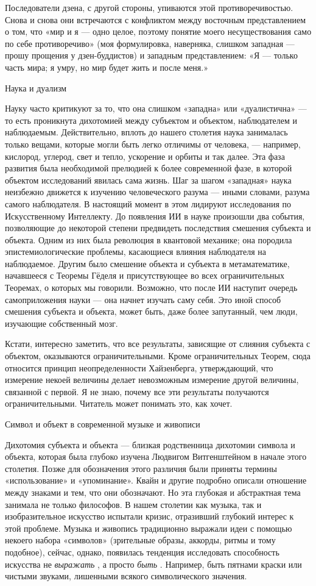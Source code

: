 \documentclass[../main.tex]{subfiles}
\begin{document}
Последователи дзена, с другой стороны, упиваются этой противоречивостью. Снова и снова они встречаются с конфликтом между восточным представлением о том, что «мир и я --- одно целое, поэтому понятие моего несуществования само по себе противоречиво» (моя формулировка, наверняка, слишком западная --- прошу прощения у дзен-буддистов) и западным представлением: «Я --- только часть мира; я умру, но мир будет жить и после меня.»

Наука и дуализм

Науку часто критикуют за то, что она слишком «западна» или «дуалистична» --- то есть проникнута дихотомией между субъектом и объектом, наблюдателем и наблюдаемым. Действительно, вплоть до нашего столетия наука занималась только вещами, которые могли быть легко отличимы от человека, --- например, кислород, углерод, свет и тепло, ускорение и орбиты и так далее. Эта фаза развития была необходимой прелюдией к более современной фазе, в которой объектом исследований явилась сама жизнь. Шаг за шагом «западная» наука неизбежно движется к изучению человеческого разума --- иными словами, разума самого наблюдателя. В настоящий момент в этом лидируют исследования по Искусственному Интеллекту. До появления ИИ в науке произошли два события, позволяющие до некоторой степени предвидеть последствия смешения субъекта и объекта. Одним из них была революция в квантовой механике; она породила эпистемиологические проблемы, касающиеся влияния наблюдателя на наблюдаемое. Другим было смешение объекта и субъекта в метаматематике, начавшееся с Теоремы Гёделя и присутствующее во всех ограничительных Теоремах, о которых мы говорили. Возможно, что после ИИ наступит очередь самоприложения науки --- она начнет изучать саму себя. Это иной способ смешения субъекта и объекта, может быть, даже более запутанный, чем люди, изучающие собственный мозг.

Кстати, интересно заметить, что все результаты, зависящие от слияния субъекта с объектом, оказываются ограничительными. Кроме ограничительных Теорем, сюда относится принцип неопределенности Хайзенберга, утверждающий, что измерение некоей величины делает невозможным измерение другой величины, связанной с первой. Я не знаю, почему все эти результаты получаются ограничительными. Читатель может понимать это, как хочет.

Символ и объект в современной музыке и живописи

Дихотомия субъекта и объекта --- близкая родственница дихотомии символа и объекта, которая была глубоко изучена Людвигом Витгенштейном в начале этого столетия. Позже для обозначения этого различия были приняты термины «использование» и «упоминание». Квайн и другие подробно описали отношение между знаками и тем, что они обозначают. Но эта глубокая и абстрактная тема занимала не только философов. В нашем столетии как музыка, так и изобразительное искусство испытали кризис, отразивший глубокий интерес к этой проблеме. Музыка и живопись традиционно выражали идеи с помощью некоего набора «символов» (зрительные образы, аккорды, ритмы и тому подобное), сейчас, однако, появилась тенденция исследовать способность искусства не \emph{выражать} , а просто \emph{быть} . Например, быть пятнами краски или чистыми звуками, лишенными всякого символического значения.
\end{document}
